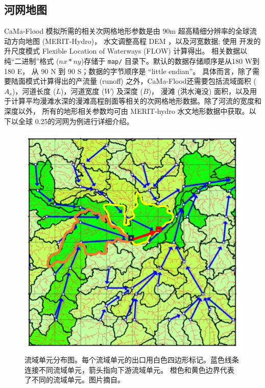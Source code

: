 \subsection{河网地图}
CaMa-Flood 模拟所需的相关次网格地形参数是由 90m 超高精细分辨率的全球流动方向地图 (MERIT-Hydro)\citep{yamazaki2019merit}，
水文调整高程 DEM \citep{yamazaki2017high,yamazaki2012analysis}，以及河宽数据\citep{yamazaki2014development}; 
使用 \citet{yamazaki2009deriving} 开发的升尺度模式 Flexible Location of Waterways (FLOW) 计算得出。
相关数据以纯``二进制''格式 ($nx*ny$)存储于 \texttt{map/} 目录下。默认的数据存储顺序是从180 \textdegree W到180 \textdegree E，
从 90 \textdegree N 到 90 \textdegree S；数据的字节顺序是 ``little endian''。
具体而言，除了需要陆面模式计算得出的产流量 (runoff) 之外，CaMa-Flood还需要包括流域面积 ($A_s$)，河道长度 ($L$)，河道宽度 ($W$) 及深度 ($B$)，
漫滩 (洪水淹没) 面积，以及用于计算平均漫滩水深的漫滩高程剖面等相关的次网格地形数据。除了河流的宽度和深度以外，
所有的地形相关参数均可由 MERIT-hydro 水文地形数据中获取。以下以全球 0.25\textdegree 的河网为例进行详细介绍。

{
\begin{figure}[]
\centering
\includegraphics{Figures/陆地表面的水分循环/流域单元分布图.png}
\caption{流域单元分布图。每个流域单元的出口用白色四边形标记。蓝色线条连接不同流域单元，箭头指向下游流域单元。
橙色和黄色边界代表了不同的流域单元。图片摘自\citet{yamazaki2013improving}。 }
\label{fig:流域单元分布图}
\end{figure}
}


